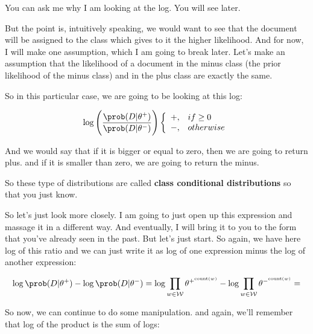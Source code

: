 \documentclass[a4paper, 12pt]{article}
\begin{document}
You can ask me why I am looking at the log. You will see later.

But the point is, intuitively speaking, we would want to see that the document
will be assigned to the class which gives to it the higher likelihood. And for
now, I will make one assumption, which I am going to break later. Let's make an
assumption that the likelihood of a document in the minus class (the prior
likelihood of the minus class) and in the plus class are exactly the same.

So in this particular case, we are going to be looking at this log:

\begin{equation}
\log \left( \frac{\prob(D|\theta^{+})}{\prob(D|\theta^{-})} \right) \left\{ \begin{array}{ll}
                                                                            +, & if \geq 0\\
                                                                            -, & otherwise
                                                                            \end{array}
                                                                    \right.                                                                      
\end{equation}


And we would say that if it is bigger or equal to zero, then we are going to
return plus. and if it is smaller than zero, we are going to return the minus.

So these type of distributions are called \textbf{class conditional distributions} so
that you just know.

So let's just look more closely. I am going to just open up this expression and
massage it in a different way. And eventually, I will bring it to you to the
form that you've already seen in the past. But let's just start. So again, we
have here log of this ratio and we can just write it as log of one expression
minus the log of another expression:

\begin{equation}
\log \prob(D|\theta^+) - \log \prob(D|\theta^-) = \log \prod_{w \in \mathcal{W}} \theta^{+^{\text{count}(w)}} - \log \prod_{w \in \mathcal{W}} \theta^{-^{\text{count}(w)}} =
\end{equation}

So now, we can continue to do some manipulation. and again, we'll remember that
log of the product is the sum of logs:
\end{document}
